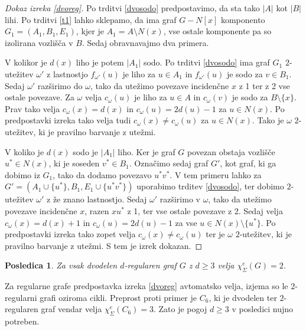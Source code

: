 \documentclass[12pt,a4paper,twoside]{article}
\theoremstyle{definition} %
\theoremstyle{plain} %
\newtheorem{posledica}[definicija]{Posledica}
\newcommand{\ec}{\chi_{\Sigma}^e}
\numberwithin{equation}{section}  %
\begin{document}
\begin{proof}[Dokaz izreka \ref{dvoreg}]
Po trditvi \ref{dvosodo} predpostavimo, da sta tako $|A|$ kot $|B|$ lihi.
Po trditvi \ref{t1} lahko sklepamo, da ima graf $G - N[x]$ komponento $G_1 = (A_1, B_1, E_1)$, kjer je $A_1 = A \setminus N(x)$, vse ostale komponente pa so izolirana vozlišča v $B$. Sedaj obravnavajmo dva primera.

V kolikor je $d(x)$ liho je potem $|A_1|$ sodo. Po trditvi \ref{dvosodo} ima graf $G_1$ $2$-utežitev $\omega'$ z lastnostjo $f_{\omega'}(u)$ je liho za $u \in A_1$ in  $f_{\omega'}(u)$ je sodo za $v \in B_1$. Sedaj $\omega'$ razširimo do $\omega$, tako da utežimo povezave incidenčne $x$ z 1 ter z 2 vse ostale povezave. Za $\omega$ velja $c_{\omega}(u)$ je liho za $u \in A$  in $c_{\omega}(v)$ je sodo za $B \setminus \{x\}$. Prav tako velja $c_{\omega}(x) = d(x)$ in $c_{\omega}(u) = 2d(u) - 1$ za $u \in N(x)$. Po predpostavki izreka tako velja tudi $c_{\omega}(x) \neq c_{\omega}(u)$ za $u \in N(x)$. Tako je $\omega$ $2$-utežitev, ki je pravilno barvanje z utežmi.

V koliko je $d(x)$ sodo je $|A_1|$ liho. Ker je graf $G$ povezan obstaja vozlišče $u^* \in N(x)$, ki je soseden $v^* \in B_1$. Označimo sedaj graf $G'$, kot graf, ki ga dobimo iz $G_1$, tako da dodamo povezavo $u^*v^*$. V tem primeru lahko za $G' = (A_1 \cup \{u^*\}, B_1, E_1 \cup \{u^*v^*\})$ uporabimo trditev \ref{dvosodo}, ter dobimo $2$-utežitev $\omega'$ z že znano lastnostjo. Sedaj $\omega'$ razširimo v $\omega$, tako da utežimo povezave incidenčne $x$, razen $xu^*$ z 1, ter vse ostale povezave z 2. Sedaj velja $c_{\omega}(x) = d(x) + 1$ in $c_{\omega}(u) = 2d(u) - 1$ za vse $u \in N(x) \setminus \{u^*\}$. Po predpostavki izreka tako zopet velja $c_{\omega}(x) \neq c_{\omega}(u)$ ter je $\omega$ $2$-utežitev, ki je pravilno barvanje z utežmi. S tem je izrek dokazan.
\end{proof}
\begin{posledica}

Za vsak dvodelen $d$-regularen graf $G$ z $d \ge 3$ velja $\ec(G) = 2$. 
\end{posledica}

Za regularne grafe predpostavka izreka \ref{dvoreg} avtomatsko velja, izjema so le $2$-regularni grafi oziroma cikli. Preprost proti primer je $C_6$, ki je dvodelen ter $2$-regularen graf vendar velja $\ec(C_6) = 3$. Zato je pogoj $d \ge 3$ v posledici nujno potreben.
\end{document}
